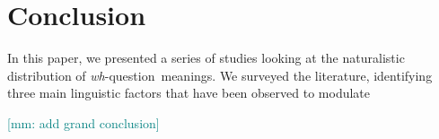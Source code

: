 \documentclass[12pt,letterpaper,table,svgnames,dvipsnames]{article}
\newcommand{\mm}[1]{\textcolor{teal}{[mm: #1]}}
\newcommand{\whq}{\emph{wh}-question~}
\begin{document}
\section{Conclusion}

In this paper, we presented a series of studies looking at the naturalistic distribution of \whq meanings. We surveyed the literature, identifying three main linguistic factors that have been observed to modulate 

\mm{add grand conclusion}




\setlength{\bibleftmargin}{.125in}
\setlength{\bibindent}{-\bibleftmargin}


\end{document}
